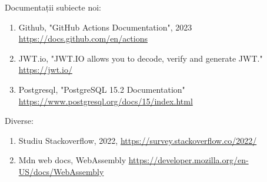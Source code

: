 \noindent Documentații subiecte noi:
\begin{enumerate}[itemsep=0.1ex,parsep=0.1ex,leftmargin=0.3cm]
    \item Github, "GitHub Actions Documentation", 2023 \href{https://docs.github.com/en/actions}{https://docs.github.com/en/actions}
    \item JWT.io, "JWT.IO allows you to decode, verify and generate JWT." \href{https://jwt.io/}{https://jwt.io/} 
    \item Postgresql, "PostgreSQL 15.2 Documentation" \href{https://www.postgresql.org/docs/15/index.html}{https://www.postgresql.org/docs/15/index.html}
\end{enumerate}

\noindent Diverse:
\begin{enumerate}[noitemsep, leftmargin=0.3cm]
    \item \label{stackoverflow-studiu-2022} Studiu Stackoverflow, 2022, \href{https://survey.stackoverflow.co/2022/}{https://survey.stackoverflow.co/2022/}
    \item Mdn web docs, WebAssembly \href{https://developer.mozilla.org/en-US/docs/WebAssembly}{https://developer.mozilla.org/en-US/docs/WebAssembly}
\end{enumerate}